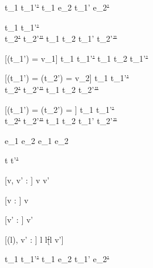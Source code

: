   {t_1\st{} \normalise t_1'\st{'}}
  {t_1 \Next e_2\st{} \normalise t_1' \Next e_2\st{'}}


  {t_1\st{}  \normalise t_1'\st{'} \\
   t_2\st{'} \normalise t_2'\st{''}}
  {t_1 \And t_2\st{} \normalise t_1' \And t_2'\st{''}}


[\Value(t_1') = v_1]
  {t_1\st{}  \normalise t_1'\st{'}}
  {t_1 \Or t_2\st{} \normalise t_1'\st{'}}

[\Value(t_1') = \bot \land \Value(t_2') = v_2]
  {t_1\st{}  \normalise t_1'\st{'} \\
   t_2\st{'} \normalise t_2'\st{''}}
  {t_1 \Or t_2\st{} \normalise t_2'\st{''}}

[\Value(t_1') = \bot \land \Value(t_2') = \bot]
  {t_1\st{}  \normalise t_1'\st{'} \\
   t_2\st{'} \normalise t_2'\st{''}}
  {t_1 \Or t_2\st{} \normalise t_1' \Or t_2'\st{''}}


  { }
  {e_1 \Xor e_2\st{} \normalise e_1 \Xor e_2\st{}}








  {t\st{}  t'\st{'}}


[v, v' : \beta]
  { }
  {\Edit v\st{}  \Edit v'\st{}}

[v : \beta]
  { }
  {\Edit v\st{} \handle{\Clear} \Enter \beta\st{}}

[v' : \beta]
  { }
  {\Enter \beta\st{}  \Edit v'\st{}}

[\Sigma(l), v' : \beta]
  { }
  {\Update l\st{}  \Update l\st[l \mapsto v']{}}


  { }
  {\Fail\st{}  \Fail\st{}}


  {t_1\st{}  t_1'\st{'}}
  {t_1 \Then e_2\st{}  t_1' \Then e_2\st{'}}

